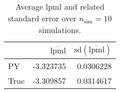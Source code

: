 \begin{table}[H]

\caption{Average lpml and related standard error over $n_{\text{sim}} = 10$ simulations.}
\centering
\begin{tabular}[t]{lrr}
\toprule
  & $\overbar{\text{lpml}}$ & $\text{sd}(\overbar{\text{lpml}})$\\
\midrule
PY & -3.323735 & 0.0306228\\
True & -3.309857 & 0.0314617\\
\bottomrule
\end{tabular}
\end{table}